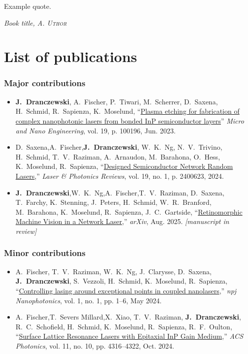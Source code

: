 \epigraph{Example quote. \lipsum[1]}{\textit{Book title, \textsc{A. Uthor}}}

\lipsum[3-7]

\chapter*{List of publications}

\subsection*{Major contributions}
\begin{itemize}
	\item \textbf{J.~Dranczewski}, A.~Fischer, P.~Tiwari, M.~Scherrer, D.~Saxena, H.~Schmid, R.~Sapienza, K.~Moselund, ``\href{https://doi.org/10.1016/j.mne.2023.100196}{Plasma etching for fabrication of complex nanophotonic lasers from bonded InP semiconductor layers}'' \textit{Micro and Nano Engineering}, vol. 19, p. 100196, Jun. 2023.

	\item D.~Saxena,\footnotemark[1] A.~Fischer,\footnotemark[1] \textbf{J.~Dranczewski}, W.~K.~Ng, N.~V.~Trivino, H.~Schmid, T.~V.~Raziman, A.~Arnaudon, M.~Barahona, O.~Hess, K.~Moselund, R.~Sapienza, ``\href{https://doi.org/10.1002/lpor.202400623}{Designed Semiconductor Network Random Lasers},'' \textit{Laser \& Photonics Reviews}, vol. 19, no. 1, p. 2400623, 2024.

	\item \textbf{J.~Dranczewski},\footnotemark[1] W.~K.~Ng,\footnotemark[1] A.~Fischer,\footnotemark[1] T.~V.~Raziman, D.~Saxena, T.~Farchy, K.~Stenning, J.~Peters, H.~Schmid, W.~R.~Branford, M.~Barahona, K.~Moselund, R.~Sapienza, J.~C.~Gartside, ``\href{https://doi.org/10.48550/arXiv.2407.15558}{Retinomorphic Machine Vision in a Network Laser},'' \textit{arXiv}, Aug. 2025. \textit{[manuscript in review]}
\end{itemize}

\subsection*{Minor contributions}
\begin{itemize}
	\item A.~Fischer, T.~V.~Raziman, W.~K.~Ng, J.~Clarysse, D.~Saxena, \textbf{J.~Dranczewski}, S.~Vezzoli, H.~Schmid, K.~Moselund, R.~Sapienza, ``\href{https://doi.org/10.1038/s44310-024-00006-9}{Controlling lasing around exceptional points in coupled nanolasers},'' \textit{npj Nanophotonics}, vol. 1, no. 1, pp. 1–6, May 2024.
	\item A.~Fischer,\footnotemark[1] T.~Severs Millard,\footnotemark[1] X.~Xiao, T.~V.~Raziman, \textbf{J.~Dranczewski}, R.~C.~Schofield, H.~Schmid, K.~Moselund, R.~Sapienza, R.~F.~Oulton, ``\href{https://doi.org/10.1021/acsphotonics.4c01236}{Surface Lattice Resonance Lasers with
	Epitaxial InP Gain Medium},'' \textit{ACS Photonics}, vol. 11, no. 10, pp. 4316–4322, Oct. 2024.
\end{itemize}

